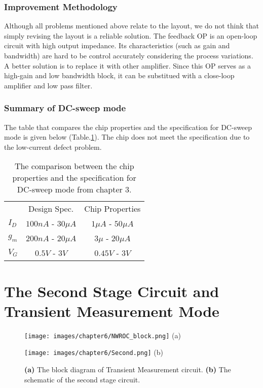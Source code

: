 \subsubsection{Improvement Methodology}
Although all problems mentioned above relate to the layout, we do not think that simply revising the layout is a reliable solution.
The feedback OP is an open-loop circuit with high output impedance.
Its characteristics (such as gain and bandwidth) are hard to be control accurately considering the process variations.
A better solution is to replace it with other amplifier.
Since this OP serves as a high-gain and low bandwidth block, it can be substitued with a close-loop amplifier and low pass filter.

\subsubsection{Summary of DC-sweep mode}
The table that compares the chip properties and the specification for DC-sweep mode is given below (Table.\ref{tb:chip:gvtR}).
The chip does not meet the specification due to the low-current defect problem.


\begin{table}[tbh!]
    {\fontfamily{}\fontsize{10}{14}\selectfont
    \centering
    \begin{tabular}{l|c|c}
        & Design Spec. & Chip Properties  \\
        $I_D$ & $100n A$ - $30\mu A$ & $1\mu A$ - $50\mu A$ \\
        \hline
        $g_m$ & $200n A$ - $20\mu A$& $3\mu $ - $20\mu A$\\
        \hline
        $V_G$ & $0.5V$ - $3V$ &  $0.45V$ - $3V$\\
    \end{tabular}
        \caption{The comparison between the chip properties and the specification for DC-sweep mode from chapter 3.}
        \label{tb:chip:gvtR}
    }
\end{table}

\section{The Second Stage Circuit and Transient Measurement Mode}
\begin{figure}[tb!hp]
    \begin{minipage}[t]{0.5\textwidth}
        \centering
        \texttt{[image: images/chapter6/NWROC\_block.png]}
        \raggedleft
        (a)
    \end{minipage}
    \hfill
    \begin{minipage}[t]{0.5\textwidth}
        \centering
        \texttt{[image: images/chapter6/Second.png]}
        \raggedleft
        (b)
    \end{minipage}
    \caption{\textbf{(a)} The block diagram of Transient Measurement circuit. \textbf{(b)} The schematic of the second stage circuit.}
    \label{fig:chip:ACschem}
\end{figure}

